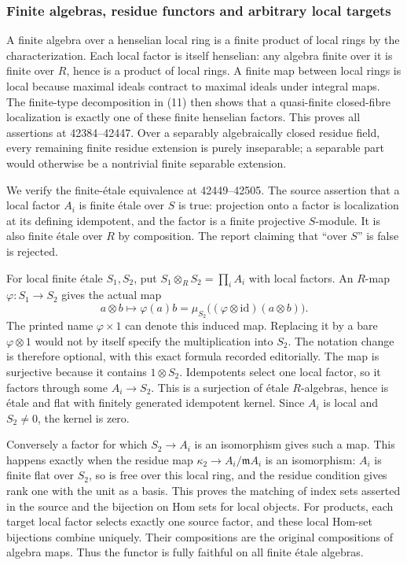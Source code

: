 \subsubsection{Finite algebras, residue functors and arbitrary local targets}\label{finite-algebras-residue-functors-and-arbitrary-local-targets}

A finite algebra over a henselian local ring is a finite product of local rings by the characterization. Each local factor is itself henselian: any algebra finite over it is finite over \(R\), hence is a product of local rings. A finite map between local rings is local because maximal ideals contract to maximal ideals under integral maps. The finite-type decomposition in (11) then shows that a quasi-finite closed-fibre localization is exactly one of these finite henselian factors. This proves all assertions at 42384--42447. Over a separably algebraically closed residue field, every remaining finite residue extension is purely inseparable; a separable part would otherwise be a nontrivial finite separable extension.

We verify the finite-étale equivalence at 42449--42505. The source assertion that a local factor \(A_i\) is finite étale over \(S\) is true: projection onto a factor is localization at its defining idempotent, and the factor is a finite projective \(S\)-module. It is also finite étale over \(R\) by composition. The report claiming that ``over \(S\)'' is false is rejected.

For local finite étale \(S_1,S_2\), put \(S_1\otimes_RS_2=\prod_i A_i\) with local factors. An \(R\)-map \(\varphi:S_1\to S_2\) gives the actual map \[
a\otimes b\longmapsto\varphi(a)b
 =\mu_{S_2}\bigl((\varphi\otimes\mathrm{id})(a\otimes b)\bigr).
\] The printed name \(\varphi\times1\) can denote this induced map. Replacing it by a bare \(\varphi\otimes1\) would not by itself specify the multiplication into \(S_2\). The notation change is therefore optional, with this exact formula recorded editorially. The map is surjective because it contains \(1\otimes S_2\). Idempotents select one local factor, so it factors through some \(A_i\to S_2\). This is a surjection of étale \(R\)-algebras, hence is étale and flat with finitely generated idempotent kernel. Since \(A_i\) is local and \(S_2\ne0\), the kernel is zero.

Conversely a factor for which \(S_2\to A_i\) is an isomorphism gives such a map. This happens exactly when the residue map \(\kappa_2\to A_i/\mathfrak mA_i\) is an isomorphism: \(A_i\) is finite flat over \(S_2\), so is free over this local ring, and the residue condition gives rank one with the unit as a basis. This proves the matching of index sets asserted in the source and the bijection on Hom sets for local objects. For products, each target local factor selects exactly one source factor, and these local Hom-set bijections combine uniquely. Their compositions are the original compositions of algebra maps. Thus the functor is fully faithful on all finite étale algebras.

